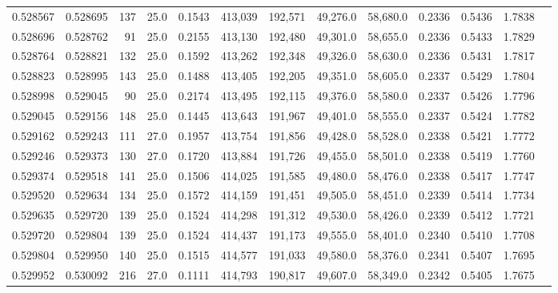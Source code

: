 \begin{tabular}{rrrrrrrrrrrrr}
0.528567 & 0.528695 &   137 & 25.0 &                                     0.1543 & 413,039 & 192,571 &  49,276.0 &  58,680.0 & 0.2336 & 0.5436 & 1.7838 \\
0.528696 & 0.528762 &    91 & 25.0 &                                     0.2155 & 413,130 & 192,480 &  49,301.0 &  58,655.0 & 0.2336 & 0.5433 & 1.7829 \\
0.528764 & 0.528821 &   132 & 25.0 &                                     0.1592 & 413,262 & 192,348 &  49,326.0 &  58,630.0 & 0.2336 & 0.5431 & 1.7817 \\
0.528823 & 0.528995 &   143 & 25.0 &                                     0.1488 & 413,405 & 192,205 &  49,351.0 &  58,605.0 & 0.2337 & 0.5429 & 1.7804 \\
0.528998 & 0.529045 &    90 & 25.0 &                                     0.2174 & 413,495 & 192,115 &  49,376.0 &  58,580.0 & 0.2337 & 0.5426 & 1.7796 \\
0.529045 & 0.529156 &   148 & 25.0 &                                     0.1445 & 413,643 & 191,967 &  49,401.0 &  58,555.0 & 0.2337 & 0.5424 & 1.7782 \\
0.529162 & 0.529243 &   111 & 27.0 &                                     0.1957 & 413,754 & 191,856 &  49,428.0 &  58,528.0 & 0.2338 & 0.5421 & 1.7772 \\
0.529246 & 0.529373 &   130 & 27.0 &                                     0.1720 & 413,884 & 191,726 &  49,455.0 &  58,501.0 & 0.2338 & 0.5419 & 1.7760 \\
0.529374 & 0.529518 &   141 & 25.0 &                                     0.1506 & 414,025 & 191,585 &  49,480.0 &  58,476.0 & 0.2338 & 0.5417 & 1.7747 \\
0.529520 & 0.529634 &   134 & 25.0 &                                     0.1572 & 414,159 & 191,451 &  49,505.0 &  58,451.0 & 0.2339 & 0.5414 & 1.7734 \\
0.529635 & 0.529720 &   139 & 25.0 &                                     0.1524 & 414,298 & 191,312 &  49,530.0 &  58,426.0 & 0.2339 & 0.5412 & 1.7721 \\
0.529720 & 0.529804 &   139 & 25.0 &                                     0.1524 & 414,437 & 191,173 &  49,555.0 &  58,401.0 & 0.2340 & 0.5410 & 1.7708 \\
0.529804 & 0.529950 &   140 & 25.0 &                                     0.1515 & 414,577 & 191,033 &  49,580.0 &  58,376.0 & 0.2341 & 0.5407 & 1.7695 \\
0.529952 & 0.530092 &   216 & 27.0 &                                     0.1111 & 414,793 & 190,817 &  49,607.0 &  58,349.0 & 0.2342 & 0.5405 & 1.7675 \\

\end{tabular}
